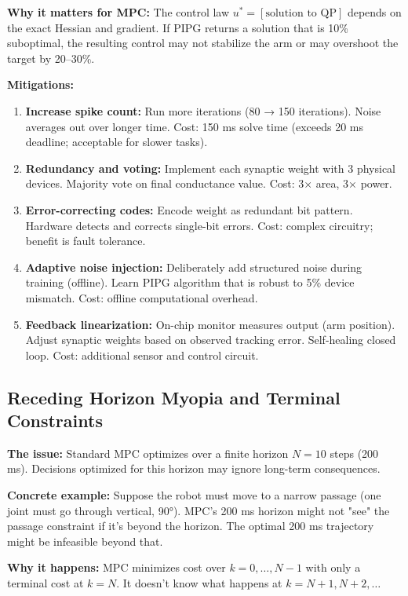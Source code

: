 \textbf{Why it matters for MPC:} The control law $u^* = [\text{solution to QP}]$ depends on the exact Hessian and gradient. If PIPG returns a solution that is 10\% suboptimal, the resulting control may not stabilize the arm or may overshoot the target by 20--30\%.

\textbf{Mitigations:}
\begin{enumerate}
\item \textbf{Increase spike count:} Run more iterations (80 → 150 iterations). Noise averages out over longer time. Cost: 150 ms solve time (exceeds 20 ms deadline; acceptable for slower tasks).

\item \textbf{Redundancy and voting:} Implement each synaptic weight with 3 physical devices. Majority vote on final conductance value. Cost: 3× area, 3× power.

\item \textbf{Error-correcting codes:} Encode weight as redundant bit pattern. Hardware detects and corrects single-bit errors. Cost: complex circuitry; benefit is fault tolerance.

\item \textbf{Adaptive noise injection:} Deliberately add structured noise during training (offline). Learn PIPG algorithm that is robust to 5\% device mismatch. Cost: offline computational overhead.

\item \textbf{Feedback linearization:} On-chip monitor measures output (arm position). Adjust synaptic weights based on observed tracking error. Self-healing closed loop. Cost: additional sensor and control circuit.
\end{enumerate}

\subsection{Receding Horizon Myopia and Terminal Constraints}

\textbf{The issue:} Standard MPC optimizes over a finite horizon $N = 10$ steps (200 ms). Decisions optimized for this horizon may ignore long-term consequences.

\textbf{Concrete example:} Suppose the robot must move to a narrow passage (one joint must go through vertical, 90°). MPC's 200 ms horizon might not "see" the passage constraint if it's beyond the horizon. The optimal 200 ms trajectory might be infeasible beyond that.

\textbf{Why it happens:} MPC minimizes cost over $k = 0, \ldots, N-1$ with only a terminal cost at $k = N$. It doesn't know what happens at $k = N+1, N+2, \ldots$

